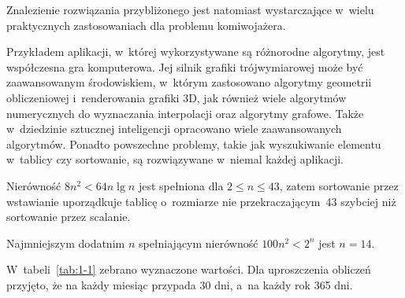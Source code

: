 Znalezienie rozwiązania przybliżonego jest natomiast wystarczające w~wielu praktycznych zastosowaniach dla problemu komiwojażera.


\exercise %
Przykładem aplikacji, w~której wykorzystywane są różnorodne algorytmy, jest współczesna gra komputerowa. Jej silnik grafiki trójwymiarowej może być zaawansowanym środowiskiem, w~którym zastosowano algorytmy geometrii obliczeniowej i~renderowania grafiki 3D, jak również wiele algorytmów numerycznych do wyznaczania interpolacji oraz algorytmy grafowe. Także w~dziedzinie sztucznej inteligencji opracowano wiele zaawansowanych algorytmów. Ponadto powszechne problemy, takie jak wyszukiwanie elementu w~tablicy czy sortowanie, są rozwiązywane w~niemal każdej aplikacji.

\exercise %
Nierówność $8n^2<64n\lg n$ jest spełniona dla $2\le n\le43$, zatem sortowanie przez wstawianie uporządkuje tablicę o~rozmiarze nie przekraczającym~43 szybciej niż sortowanie przez scalanie.

\exercise %
Najmniejszym dodatnim $n$ spełniającym nierówność $100n^2<2^n$ jest $n=14$.

\problems

W~tabeli~\ref{tab:1-1} zebrano wyznaczone wartości. Dla uproszczenia obliczeń przyjęto, że na każdy miesiąc przypada 30 dni, a~na każdy rok 365 dni.

